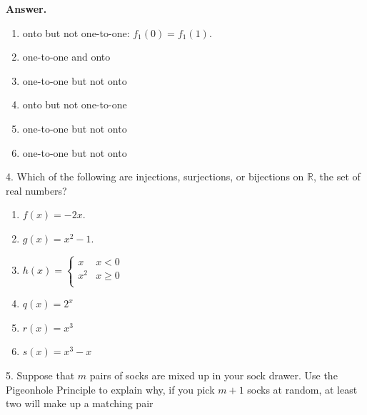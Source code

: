 \documentclass[10pt,]{book}
\theoremstyle{plain}
\theoremstyle{definition}
\theoremstyle{definition}
\theoremstyle{definition}
\begin{document}
\begin{exercisegroup}
\begin{enumerate}[label=\alph*]
\end{enumerate}
%
\par\smallskip
\par\smallskip
\noindent\textbf{Answer.}\hypertarget{answer-5}{}\quad
\leavevmode%
\begin{enumerate}[label=\alph*]
\item\hypertarget{li-37}{} onto but not one-to-one: \(f_1(0)=f_1(1)\).%
\item\hypertarget{li-38}{} one-to-one and onto\\%
\item\hypertarget{li-39}{} one-to-one but not onto\\%
\item\hypertarget{li-40}{} onto but not one-to-one\\%
\item\hypertarget{li-41}{} one-to-one but not onto\\%
\item\hypertarget{li-42}{} one-to-one but not onto%
\end{enumerate}
%
\item[4.]\hypertarget{exercise-12}{} Which of the following are injections, surjections, or bijections on \(\mathbb{R}\), the set of real numbers?%
\par
\leavevmode%
\begin{enumerate}[label=\alph*]
\item\hypertarget{li-43}{} \(f(x) = -2x\).%
\item\hypertarget{li-44}{} \(g(x) = x^2- 1\).%
\item\hypertarget{li-45}{} \(h(x)=\left\{ \begin{array}{cc}
 x & x < 0 \\
 x^2 & x\geq 0 \\
\end{array} \right.\)%
\item\hypertarget{li-46}{} \(q(x)=2^x\)%
\item\hypertarget{li-47}{} \(r(x) =x^3\)%
\item\hypertarget{li-48}{} \(s(x) = x^3-x\)%
\end{enumerate}
%
\par\smallskip
\item[5.]\hypertarget{exercise-13}{} Suppose that \(m\) pairs of socks are mixed up in your sock drawer. Use the Pigeonhole Principle to explain why, if you pick \(m + 1\)
socks at random, at least two will make up a matching pair%
\par\smallskip
\par\smallskip

\end{exercisegroup}
\end{document}
